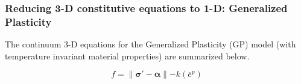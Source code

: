 \documentclass[11pt]{report}
\numberwithin{equation}{section}
\newcommand{\bmf } {\boldsymbol }
\begin{document}
%








%

\subsubsection{Reducing 3-D constitutive equations to 1-D: Generalized Plasticity}
The continuum 3-D equations for the Generalized Plasticity (GP) model 
(with temperature invariant material properties)  are summarized below.

\begin{equation} \label{E:yield_surface}
f = \parallel \bmf{\sigma}' - \bmf{\alpha} \parallel - k(\bar e^p) 
\end{equation}
\end{document}
